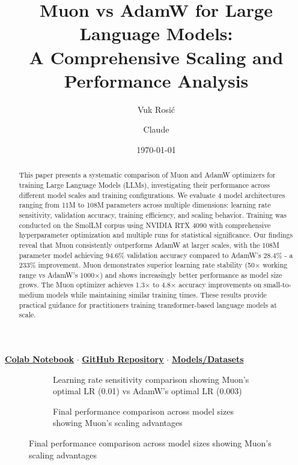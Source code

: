 \documentclass[11pt,a4paper]{article}
\title{\Large\bfseries Muon vs AdamW for Large Language Models:\\[0.3em]
\large A Comprehensive Scaling and Performance Analysis}
\author[1]{Vuk Rosić}
\author[2]{Claude}
\affil[1]{Óbuda University, \texttt{vukrosic1@gmail.com}}
\affil[2]{Anthropic}
\date{\today}
\begin{document}
\maketitle

\begin{center}
\textbf{\href{https://colab.research.google.com/your-notebook}{Colab Notebook}} $\cdot$
\textbf{\href{https://github.com/your-repo}{GitHub Repository}} $\cdot$
\textbf{\href{https://huggingface.co/your-models}{Models/Datasets}}
\end{center}

\begin{abstract}
This paper presents a systematic comparison of Muon and AdamW optimizers for training Large Language Models (LLMs), investigating their performance across different model scales and training configurations. We evaluate 4 model architectures ranging from 11M to 108M parameters across multiple dimensions: learning rate sensitivity, validation accuracy, training efficiency, and scaling behavior. Training was conducted on the SmolLM corpus using NVIDIA RTX 4090 with comprehensive hyperparameter optimization and multiple runs for statistical significance. Our findings reveal that Muon consistently outperforms AdamW at larger scales, with the 108M parameter model achieving 94.6\% validation accuracy compared to AdamW's 28.4\% - a 233\% improvement. Muon demonstrates superior learning rate stability (50× working range vs AdamW's 1000×) and shows increasingly better performance as model size grows. The Muon optimizer achieves 1.3× to 4.8× accuracy improvements on small-to-medium models while maintaining similar training times. These results provide practical guidance for practitioners training transformer-based language models at scale.
\end{abstract}

\begin{figure}[H]
    \centering
    \begin{subfigure}{0.48\textwidth}
        \centering
        \caption{Learning rate sensitivity comparison showing Muon's optimal LR (0.01) vs AdamW's optimal LR (0.003)}
        \label{fig:lr_sensitivity}
    \end{subfigure}
    \hfill
    \begin{subfigure}{0.48\textwidth}
        \centering
        \caption{Final performance comparison across model sizes showing Muon's scaling advantages}
        \label{fig:performance_scaling}
    \end{subfigure}
\end{figure}
\end{document}
